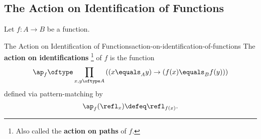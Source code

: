 \subsection{The Action on Identification of Functions}\label{the-action-on-identification-of-functions}
Let $f\colon A\to B$ be a function.
\begin{definition}{The Action on Identification of Functions}{action-on-identification-of-functions}%
    The \textbf{action on identifications}%
    \footnote{%
        Also called the \textbf{action on paths} of $f$.
        \par\vspace*{\TCBBoxCorrection}
    } %
    of $f$ is the function
    \[
        \ap_{f}%
        \oftype%
        \prod_{x,y\oftype A}\left((x\equals_{A}y)\to(f(x)\equals_{B}f(y))\right)%
    \]%
    defined via pattern-matching by
    \[
        \ap_{f}(\refl_{x})%
        \defeq%
        \refl_{f(x)}.%
    \]%
\end{definition}

